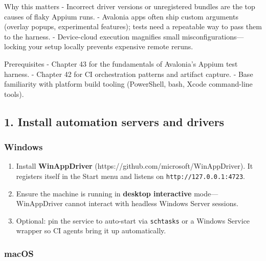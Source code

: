 Why this matters - Incorrect driver versions or unregistered bundles are
the top causes of flaky Appium runs. - Avalonia apps often ship custom
arguments (overlay popups, experimental features); tests need a
repeatable way to pass them to the harness. - Device-cloud execution
magnifies small misconfigurations---locking your setup locally prevents
expensive remote reruns.

Prerequisites - Chapter 43 for the fundamentals of Avalonia's Appium
test harness. - Chapter 42 for CI orchestration patterns and artifact
capture. - Base familiarity with platform build tooling (PowerShell,
bash, Xcode command-line tools).

\subsection{1. Install automation servers and
drivers}\label{install-automation-servers-and-drivers}

\subsubsection{Windows}\label{windows-4}

\begin{enumerate}
\def\labelenumi{\arabic{enumi}.}
\tightlist
\item
  Install \textbf{WinAppDriver}
  (https://github.com/microsoft/WinAppDriver). It registers itself in
  the Start menu and listens on
  \passthrough{\lstinline!http://127.0.0.1:4723!}.
\item
  Ensure the machine is running in \textbf{desktop interactive}
  mode---WinAppDriver cannot interact with headless Windows Server
  sessions.
\item
  Optional: pin the service to auto-start via
  \passthrough{\lstinline!schtasks!} or a Windows Service wrapper so CI
  agents bring it up automatically.
\end{enumerate}

\subsubsection{macOS}\label{macos-4}

